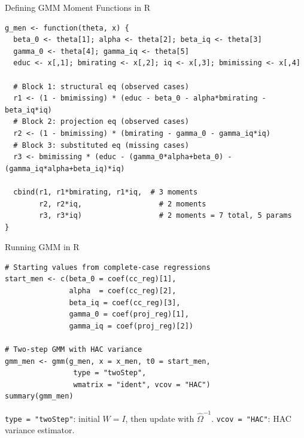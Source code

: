 \documentclass[aspectratio=169, handout, t]{beamer}
\numberwithin{equation}{section}
\begin{document}
\begin{frame}[fragile]{Defining GMM Moment Functions in R}

\begin{lstlisting}[basicstyle=\ttfamily\scriptsize]
g_men <- function(theta, x) {
  beta_0 <- theta[1]; alpha <- theta[2]; beta_iq <- theta[3]
  gamma_0 <- theta[4]; gamma_iq <- theta[5]
  educ <- x[,1]; bmirating <- x[,2]; iq <- x[,3]; bmimissing <- x[,4]

  # Block 1: structural eq (observed cases)
  r1 <- (1 - bmimissing) * (educ - beta_0 - alpha*bmirating - beta_iq*iq)
  # Block 2: projection eq (observed cases)
  r2 <- (1 - bmimissing) * (bmirating - gamma_0 - gamma_iq*iq)
  # Block 3: substituted eq (missing cases)
  r3 <- bmimissing * (educ - (gamma_0*alpha+beta_0) - (gamma_iq*alpha+beta_iq)*iq)

  cbind(r1, r1*bmirating, r1*iq,  # 3 moments
        r2, r2*iq,                  # 2 moments
        r3, r3*iq)                  # 2 moments = 7 total, 5 params
}
\end{lstlisting}

\end{frame}

\begin{frame}[fragile]{Running GMM in R}

\begin{lstlisting}[basicstyle=\ttfamily\scriptsize]
# Starting values from complete-case regressions
start_men <- c(beta_0 = coef(cc_reg)[1],
               alpha  = coef(cc_reg)[2],
               beta_iq = coef(cc_reg)[3],
               gamma_0 = coef(proj_reg)[1],
               gamma_iq = coef(proj_reg)[2])

# Two-step GMM with HAC variance
gmm_men <- gmm(g_men, x = x_men, t0 = start_men,
                type = "twoStep",
                wmatrix = "ident", vcov = "HAC")
summary(gmm_men)
\end{lstlisting}
\texttt{type = "twoStep"}: initial $W = I$, then update with $\hat\Omega^{-1}$.  \texttt{vcov = "HAC"}: HAC variance estimator.

\end{frame}
\end{document}
